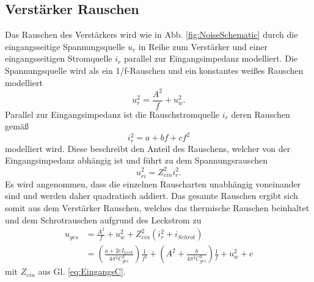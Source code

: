 \subsection*{Verstärker Rauschen}
Das Rauschen des Verstärkers wird wie in Abb. \ref{fig:NoiseSchematic} durch die eingangsseitige Spannungsquelle $u_r$ in Reihe zum Verstärker und einer eingangsseitigen  Stromquelle $i_r$ parallel zur Eingangsimpedanz modelliert.
Die Spannungsquelle wird als ein 1/f-Rauschen und ein konstantes weißes Rauschen modelliert\cite{horowitz1980art}
\begin{equation}
u^2_r = \frac{A^2}{f} + u^2_w.
\end{equation}
Parallel zur Eingangsimpedanz ist die Rauschstromquelle $i_r$ deren Rauschen gemäß
\begin{equation}
i^2_r = a + bf + cf^2
\end{equation}
modelliert wird\cite{Thomas2016}.
Diese beschreibt den Anteil des Rauschens, welcher von der Eingangsimpedanz abhängig ist und führt zu dem Spannungsrauschen
\begin{equation}
u^2_{ri} = Z^2_{ein}i^2_r.
\end{equation}
Es wird angenommen, dass die einzelnen Rauscharten unabhängig voneinander sind und werden daher quadratisch addiert.
Das gesamte Rauschen ergibt sich somit aus dem Verstärker Rauschen, welches das thermische Rauschen beinhaltet und dem Schrotrauschen aufgrund des Leckstrom zu
\begin{align}
u_{ges} &= \frac{A^2}{f} + u^2_w + Z^2_{ein}(i^2_r + i_{Schrot}) \\
&= \left(\frac{a + 2eI_{Leck}}{4\pi^2 C^2_{ges}}\right)\frac{1}{f^2} + \left(A^2 + \frac{b}{4\pi^2 C^2_{ges}}\right)\frac{1}{f} + u^2_w + c
\label{eq:Rauschen}
\end{align}
mit $Z_{ein}$ aus Gl. \eqref{eq:EingangsC}.
